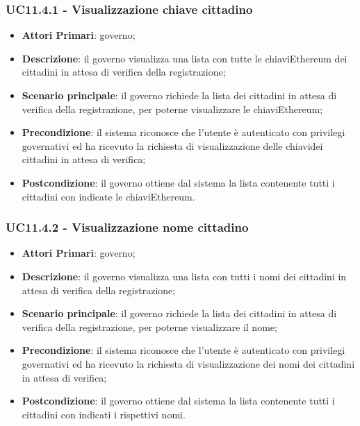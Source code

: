 \subsubsection{UC11.4.1 - Visualizzazione chiave cittadino}
\begin{itemize}
	\item \textbf{Attori Primari}: governo;
	\item \textbf{Descrizione}: il governo visualizza una lista con tutte le chiavi\glosp Ethereum dei cittadini in attesa di verifica della registrazione;
	\item \textbf{Scenario principale}: il governo richiede la lista dei cittadini in attesa di verifica della registrazione, per poterne visualizzare le chiavi\glosp Ethereum;
	\item \textbf{Precondizione}: il sistema riconosce che l'utente è autenticato con privilegi governativi ed ha ricevuto la richiesta di visualizzazione delle chiavi\glosp dei cittadini in attesa di verifica;
	\item \textbf{Postcondizione}: il governo ottiene dal sistema la lista contenente tutti i cittadini con indicate le chiavi\glosp Ethereum. 
\end{itemize}
\subsubsection{UC11.4.2 - Visualizzazione nome cittadino}
\begin{itemize}
	\item \textbf{Attori Primari}: governo;
	\item \textbf{Descrizione}: il governo visualizza una lista con tutti i nomi dei cittadini in attesa di verifica della registrazione;
	\item \textbf{Scenario principale}: il governo richiede la lista dei cittadini in attesa di verifica della registrazione, per poterne visualizzare il nome;
	\item \textbf{Precondizione}: il sistema riconosce che l'utente è autenticato con privilegi governativi ed ha ricevuto la richiesta di visualizzazione dei nomi dei cittadini in attesa di verifica;
	\item \textbf{Postcondizione}: il governo ottiene dal sistema la lista contenente tutti i cittadini con indicati i rispettivi nomi.
\end{itemize}
